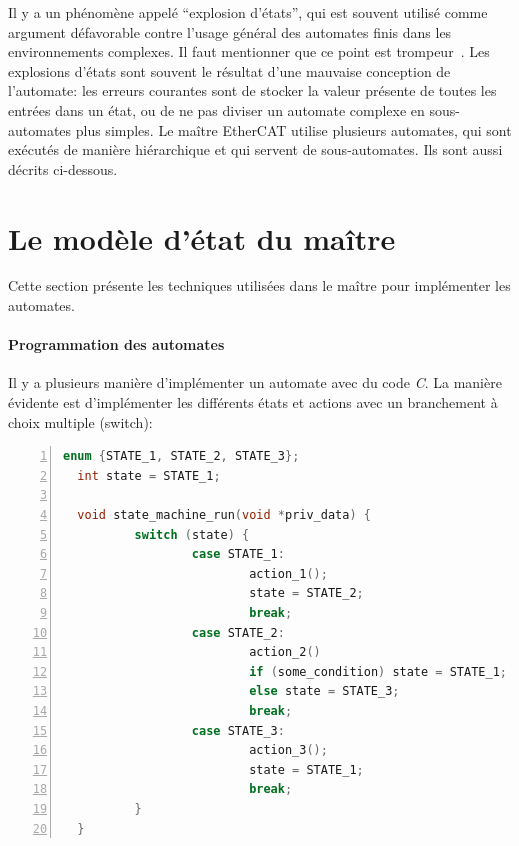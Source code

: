\documentclass[a4paper,12pt,BCOR=6mm,bibtotoc,idxtotoc]{scrbook}
\begin{document}
Il y a un ph\'enom\`ene appel\'e ``explosion d'\'etats'', qui est souvent
utilis\'e comme argument d\'efavorable contre l'usage g\'en\'eral des
automates finis dans les environnements complexes. Il faut mentionner
que ce point est trompeur~\cite{fsmmis}.  Les explosions d'\'etats sont
souvent le r\'esultat d'une mauvaise conception de l'automate: les
erreurs courantes sont de stocker la valeur pr\'esente de toutes les
entr\'ees dans un \'etat, ou de ne pas diviser un automate complexe
en sous-automates plus simples.  Le ma\^itre EtherCAT utilise plusieurs
automates, qui sont ex\'ecut\'es de mani\`ere hi\'erarchique et qui
servent de sous-automates. Ils sont aussi d\'ecrits ci-dessous.



\section{Le mod\`ele d'\'etat du ma\^itre}
\label{sec:statemodel}

Cette section pr\'esente les techniques utilis\'ees dans le ma\^itre
pour impl\'ementer les automates.

\paragraph{Programmation des automates}

Il y a plusieurs mani\`ere d'impl\'ementer un automate avec du code
\textit{C}.  La mani\`ere \'evidente est d'impl\'ementer les
diff\'erents \'etats et actions avec un branchement \`a choix multiple
(switch):

\begin{lstlisting}[gobble=2,language=C,numbers=left]
  enum {STATE_1, STATE_2, STATE_3};
  int state = STATE_1;

  void state_machine_run(void *priv_data) {
          switch (state) {
                  case STATE_1:
                          action_1();
                          state = STATE_2;
                          break;
                  case STATE_2:
                          action_2()
                          if (some_condition) state = STATE_1;
                          else state = STATE_3;
                          break;
                  case STATE_3:
                          action_3();
                          state = STATE_1;
                          break;
          }
  }
\end{lstlisting}
\end{document}
